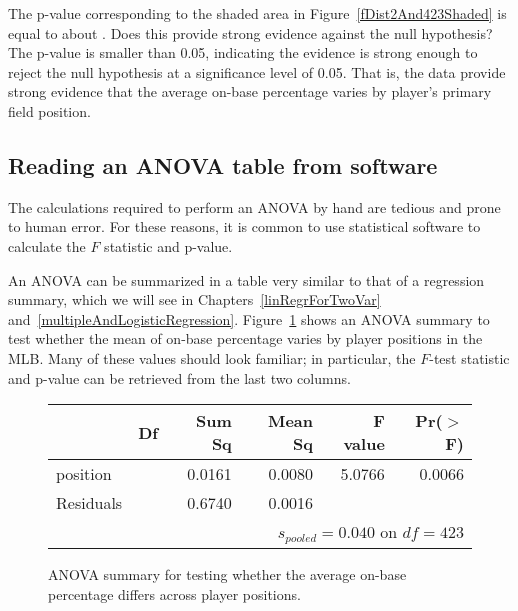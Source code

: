 \begin{examplewrap}
\begin{nexample}{The p-value corresponding to
    the shaded area in
    Figure~\ref{fDist2And423Shaded}
    is equal to about \mlbPvalue{}.
    Does this provide strong evidence against the
    null hypothesis?}
  The p-value is smaller than 0.05, indicating the evidence
  is strong enough to reject the null hypothesis
  at a significance level of 0.05.
  That is, the data provide strong evidence that the average
  on-base percentage varies by player's primary field position.
\end{nexample}
\end{examplewrap}


\subsection{Reading an ANOVA table from software}

The calculations required to perform an ANOVA by hand are
tedious and prone to human error.
For these reasons, it is common to use statistical software
to calculate the $F$ statistic and p-value.

An ANOVA can be summarized in a table very similar to that
of a regression summary, which we will see in
Chapters~\ref{linRegrForTwoVar}
and~\ref{multipleAndLogisticRegression}.
Figure~\ref{anovaSummaryTableForOBPAgainstPosition}
shows an ANOVA summary to test whether the mean of on-base
percentage varies by player positions in the MLB.
Many of these values should look familiar;
in particular, the $F$-test statistic and p-value
can be retrieved from the last two columns.

\begin{figure}[ht]
\centering
\begin{tabular}{lrrrrr}
  \hline
  & Df & Sum Sq & Mean Sq & F value & Pr($>$F) \\ 
  \hline
  position & \mlbDFA{} & 0.0161 & 0.0080 & 5.0766 & 0.0066 \\ 
  Residuals & \mlbDFB{} & 0.6740 & 0.0016 &  &  \\ 

  \hline
\multicolumn{6}{r}{$s_{pooled} = 0.040$ on $df = 423$}
\end{tabular}
\caption{ANOVA summary for testing whether the average
    on-base percentage differs across player positions.}
\label{anovaSummaryTableForOBPAgainstPosition}
\end{figure}


\D{\newpage}

